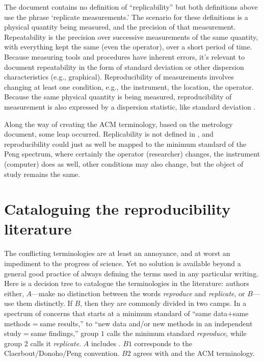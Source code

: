 \documentclass{statement}
\newlength{\up}
\begin{document}
The document contains no definition of ``replicability'' but both definitions above use the phrase `replicate measurements.' The scenario for these definitions is a physical quantity being measured, and the precision of that measurement. Repeatability is the precision over successive measurements of the same quantity, with everything kept the same (even the operator), over a short period of time. 
Because measuring tools and procedures have inherent errors, it's relevant to document repeatability in the form of standard deviation or other dispersion characteristics (e.g., graphical).
Reproducibility of measurements involves changing at least one condition, e.g., the instrument, the location, the operator. 
Because the same physical quantity is being measured, reproducibility of measurement is also expressed by a dispersion statistic, like standard deviation \cite[]{taylorETal1994}. 

Along the way of creating the ACM terminology, based on the metrology document, some leap occurred. Replicability is not defined in \cite{jcgm2008}, and reproducibility could just as well be mapped to the minimum standard of the Peng spectrum, where certainly the operator (researcher) changes, the instrument (computer) does as well, other conditions may also change, but the object of study remains the same.


\section*{Cataloguing the reproducibility literature}
\vspace{\up}

The conflicting terminologies are at least an annoyance, and at worst an impediment to the progress of science. Yet no solution is available beyond a general good practice of always defining the terms used in any particular writing. 
Here is a decision tree to catalogue the terminologies in the literature: 
authors either, $A$---make no distinction between the words \emph{reproduce} and \emph{replicate}, or $B$---use them distinctly.  
If $B$, then they are commonly divided in two camps. 
In a spectrum of concerns that starts at a minimum standard of ``same data$+$same methods$=$same results,'' to ``new data and/or new methods in an independent study$=$same findings,'' group $1$ calls the minimum standard \emph{reproduce}, while group $2$ calls it \emph{replicate}.
$A$ includes \cite{king1995}.
$B1$ corresponds to the Claerbout/Donoho/Peng convention.
$B2$ agrees with \cite{drummond2009} and the ACM terminology.












\end{document}
